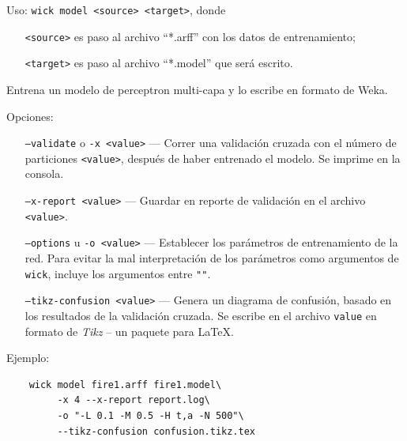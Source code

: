 \documentclass{article}
\begin{document}
\bigskip
\noindent

Uso: \verb|wick model <source> <target>|, donde
\begin{itemize}[leftmargin=9em]
\item[\texttt{<source>}] es paso al archivo ``*.arff'' con los datos de entrenamiento;
\item[\texttt{<target>}] es paso al archivo ``*.model'' que será escrito.
\end{itemize}

Entrena un modelo de perceptron multi-capa y lo escribe en formato de Weka.

\medskip
\noindent
Opciones:
\begin{itemize}[align=left]
\item[\texttt{--validate} o \texttt{-x <value>}] --- Correr una validación cruzada con el número 
                                                     de particiones \verb|<value>|, después de 
                                                     haber entrenado el modelo. 
                                                     Se imprime en la consola.
\item[\texttt{--x-report <value>}] --- Guardar en reporte de validación en el 
                                       archivo \verb|<value>|.
\item[\texttt{--options} u \texttt{-o <value>}] --- Establecer los parámetros de entrenamiento
                                                    de la red. Para evitar la mal interpretación
                                                    de los parámetros como argumentos de
                                                    \verb|wick|, incluye los argumentos entre
                                                    \verb|""|.
\item[\texttt{--tikz-confusion <value>}] --- Genera un diagrama de confusión, basado en los
                                             resultados de la validación cruzada.
                                             Se escribe en el archivo \verb|value| en formato
                                             de \emph{Tikz} -- un paquete para \LaTeX.
\end{itemize}

\noindent
Ejemplo:

\begin{verbatim}
    wick model fire1.arff fire1.model\
         -x 4 --x-report report.log\
         -o "-L 0.1 -M 0.5 -H t,a -N 500"\
         --tikz-confusion confusion.tikz.tex

\end{verbatim}
\end{document}
